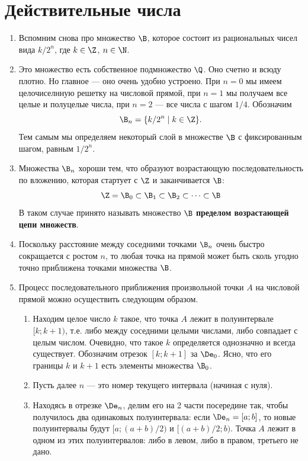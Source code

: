 \section{Действительные числа}



\begin{enumerate}
\item Вспомним снова про множество $\B$, которое состоит из рациональных чисел вида $k/2^n$, где $k\in\Z$, $n\in\N$.
\item Это множество есть собственное подмножество $\Q$. Оно счетно и всюду плотно. Но главное --- оно очень удобно устроено.
При $n=0$ мы имеем целочиселнную решетку на числовой прямой, при $n=1$ мы получаем все целые и полуцелые числа, при $n=2$ --- все числа с шагом $1/4$. Обозначим
$$
\B_n=\{k/2^n\mid k\in\Z\}.
$$
Тем самым мы определяем некоторый слой в множестве $\B$ с фиксированным шагом, равным $1/2^n$.
\item Множества $\B_n$ хороши тем, что образуют возрастающую последовательность по вложению, которая стартует с $\Z$ и заканчивается $\B$:
$$
\Z=\B_0\subset\B_1\subset\B_2\subset\dots\subset\B
$$
В таком случае принято называть множество $\B$ \textbf{пределом возрастающей цепи множеств}.
\item Поскольку расстояние между соседними точками $\B_n$ очень быстро сокращается с ростом $n$, то любая точка на прямой может быть сколь угодно точно приближена точками множества $\B$.
\item Процесс последовательного приближения произвольной точки $A$ на числовой прямой можно осуществить следующим образом.
\begin{enumerate}[{\bf Step1}]
\item Находим целое число $k$ такое, что точка $A$ лежит в полуинтервале $[k;k+1)$, т.е. либо между соседними целыми числами, либо совпадает с целым числом. Очевидно, что такое $k$ определяется однозначно и всегда существует. Обозначим отрезок $[k;k+1]$ за $\De_0$. Ясно, что его границы $k$ и $k+1$ есть элементы множества $\B_0$.
\item Пусть далее $n$ --- это номер текущего интервала (начиная с нуля).
\item Находясь в отрезке $\De_n$, делим его на 2 части посередине так, чтобы получилось два одинаковых полуинтервала: если $\De_n=[a;b]$, то новые полуинтервалы будут $[a;(a+b)/2)$ и $[(a+b)/2;b)$. Точка $A$ лежит в одном из этих полуинтервалов: либо в левом, либо в правом, третьего не дано.


\end{enumerate}
\end{enumerate}
